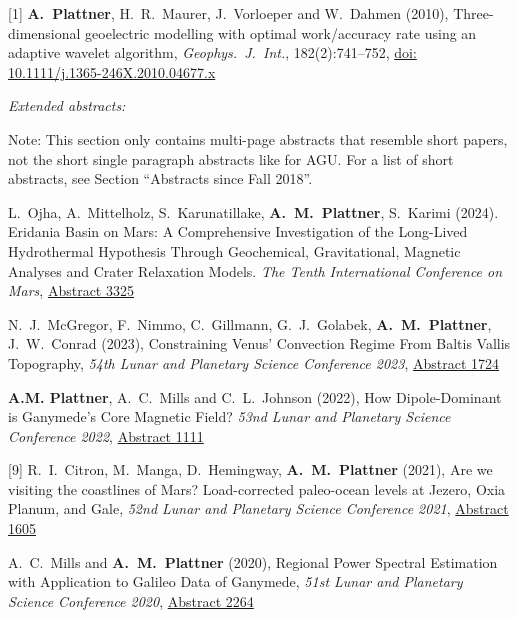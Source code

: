 \documentclass[10pt]{article}
\begin{document}
\spcp
\hspace{-0.5cm}[1] \textbf{A.~Plattner}, H.~R.~Maurer, J.~Vorloeper and W.~Dahmen (2010),
Three-dimensional geoelectric modelling with optimal work/accuracy rate 
using an adaptive wavelet algorithm,
\emph{Geophys.~J.~Int.}, 182(2):741--752,
\href{https://academic.oup.com/gji/article-lookup/doi/10.1111/j.1365-246X.2010.04677.x}{doi: 10.1111/j.1365-246X.2010.04677.x}

\clearpage
\emph{Extended abstracts:}


\vspace{0.2cm}
Note: This section only contains multi-page abstracts that resemble short papers, not the short single paragraph abstracts like for AGU. For a list of short abstracts, see Section ``Abstracts since Fall 2018''.

\spcp
\shift [12] L.\ Ojha, A.\ Mittelholz, S.\ Karunatillake, \textbf{A.\ M.\ Plattner}, S.\ Karimi (2024). Eridania Basin on Mars: A Comprehensive Investigation of the Long-Lived Hydrothermal Hypothesis Through Geochemical, Gravitational, Magnetic Analyses and Crater Relaxation Models. \emph{The Tenth International Conference on Mars}, \href{https://www.hou.usra.edu/meetings/tenthmars2024/pdf/3325.pdf}{Abstract 3325}

\spcp
\shift [11] N.~J.~McGregor, F.~Nimmo, C.~Gillmann, G.~J.~Golabek, \textbf{A.~M.~Plattner}, J.~W.~Conrad (2023), Constraining Venus' Convection Regime From Baltis Vallis Topography, \emph{54th Lunar and Planetary Science Conference 2023},
\href{https://www.hou.usra.edu/meetings/lpsc2023/pdf/1724.pdf}{Abstract 1724}


\spcp
\shift [10] \textbf{A.M. Plattner}, A.~C.~Mills and C.~L.~Johnson (2022), How Dipole-Dominant is Ganymede's Core Magnetic Field?
\emph{53nd Lunar and Planetary Science Conference 2022},
\href{https://www.hou.usra.edu/meetings/lpsc2022/pdf/1111.pdf}{Abstract 1111}

\spcp
\hspace{-0.5cm}[9] R.~I.~Citron, M.~Manga, D.~Hemingway, \textbf{A.~M.~Plattner} (2021),
Are we visiting the coastlines of Mars? Load-corrected paleo-ocean levels at Jezero, Oxia Planum, and Gale,
\emph{52nd Lunar and Planetary Science Conference 2021},
\href{https://www.hou.usra.edu/meetings/lpsc2021/pdf/1605.pdf}{Abstract 1605}

\spcp
\hspace{-0.77cm} \gr[8] A.~C.~Mills and \textbf{A.~M.~Plattner}
(2020),
Regional Power Spectral Estimation with Application to Galileo Data of Ganymede,
\emph{51st Lunar and Planetary Science Conference 2020},
\href{https://www.hou.usra.edu/meetings/lpsc2020/pdf/2264.pdf}{Abstract 2264}
\end{document}
